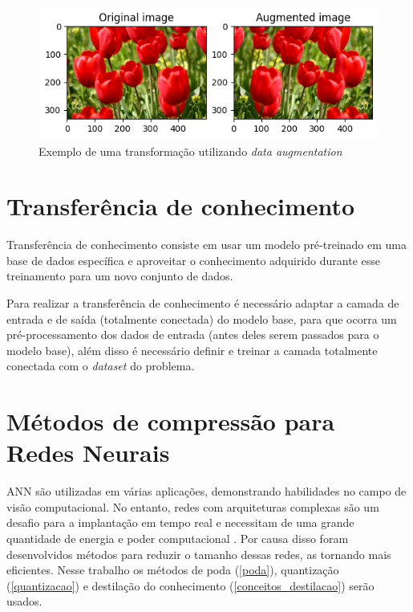 \begin{figure}[htb]
	\caption {\label{cap_conceitos_exemplo_da}Exemplo de uma transformação utilizando \textit{data augmentation}}
	\begin{center}
		\includegraphics[scale=1]{Imagens/exemplo_da}
	\end{center}
\end{figure}

\section{Transferência de conhecimento}\label{cap_conceitos_transferencia}
Transferência de conhecimento consiste em usar um modelo pré-treinado em uma base de dados específica e aproveitar
o conhecimento adquirido durante esse treinamento para um novo conjunto de dados.

Para realizar a transferência de conhecimento é necessário adaptar a camada de entrada e de saída
(totalmente conectada) do modelo base, para que ocorra um pré-processamento dos dados de entrada
(antes deles serem passados para o modelo base), além disso é necessário definir e treinar a camada totalmente
conectada com o \textit{dataset} do problema.

\section{Métodos de compressão para Redes Neurais}\label{cap_conceitos_compressao_redes}
ANN são utilizadas em várias aplicações, demonstrando habilidades no campo de visão computacional.
No entanto, redes com arquiteturas complexas são um desafio para a implantação em tempo real e necessitam de uma
grande quantidade de energia e poder computacional \cite{LIANG2021370}.
Por causa disso foram desenvolvidos métodos para reduzir o tamanho dessas redes, as tornando mais eficientes.
Nesse trabalho os métodos de poda (\autoref{poda}), quantização (\autoref{quantizacao}) e destilação do conhecimento
(\autoref{conceitos_destilacao}) serão usados.

